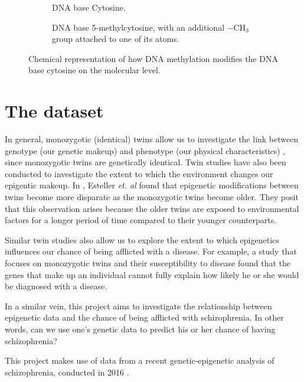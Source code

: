 \documentclass[12pt, twoside, a4paper]{report}
\begin{document}
\begin{figure}[t!]
\begin{subfigure}[t]{0.5\textwidth}
	\centering
	\caption{DNA base Cytosine.}
\end{subfigure}%
\begin{subfigure}[t]{0.5\textwidth}
	\centering
	\caption{DNA base 5-methylcytosine, with an additional $-$CH$_3$ group attached to one of its atoms.}
\end{subfigure}
\caption{Chemical representation of how DNA methylation modifies the DNA base cytosine on the molecular level.}
\label{bg:bio:methylation}
\end{figure}

\section{The dataset} \label{bg_genetic_data}
In general, monozygotic (identical) twins allow us to investigate the link between genotype (our genetic makeup) and phenotype (our physical characteristics) \cite{RefWorks:104, RefWorks:250}, since monozygotic twins are genetically identical. Twin studies have also been conducted to investigate the extent to which the environment changes our epigentic makeup. In \cite{RefWorks:251}, Esteller \textit{et. al} found that epigenetic modifications between twins become more disparate as the monozygotic twins become older. They posit that this observation arises because the older twins are exposed to environmental factors for a longer period of time compared to their younger counterparts.

Similar twin studies also allow us to explore the extent to which epigenetics influences our chance of being afflicted with a disease. For example, a study \cite{RefWorks:105} that focuses on monozygotic twins and their susceptibility to disease found that the genes that make up an individual cannot fully explain how likely he or she would be diagnosed with a disease.

In a similar vein, this project aims to investigate the relationship between epigenetic data and the chance of being afflicted with schizophrenia. In other words, can we use one's genetic data to predict his or her chance of having schizophrenia?

This project makes use of data from a recent genetic-epigenetic analysis of schizophrenia, conducted in 2016 \cite{RefWorks:78}.
\end{document}
